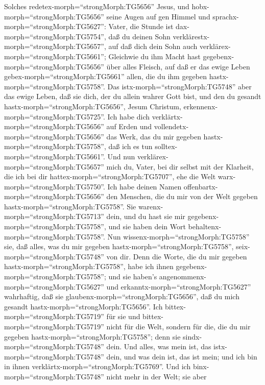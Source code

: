  Solches redetex-morph=``strongMorph:TG5656'' Jesus, und
hobx-morph=``strongMorph:TG5656'' seine Augen auf gen Himmel und
sprachx-morph=``strongMorph:TG5627'': Vater, die Stunde ist
dax-morph=``strongMorph:TG5754'', daß du deinen Sohn
verklärestx-morph=``strongMorph:TG5657'', auf daß dich dein Sohn auch
verklärex-morph=``strongMorph:TG5661'';  Gleichwie du ihm
Macht hast gegebenx-morph=``strongMorph:TG5656'' über alles Fleisch, auf
daß er das ewige Leben gebex-morph=``strongMorph:TG5661'' allen, die du
ihm gegeben hastx-morph=``strongMorph:TG5758''.  Das
istx-morph=``strongMorph:TG5748'' aber das ewige Leben, daß sie dich,
der du allein wahrer Gott bist, und den du gesandt
hastx-morph=``strongMorph:TG5656'', Jesum Christum,
erkennenx-morph=``strongMorph:TG5725''.  Ich habe dich
verklärtx-morph=``strongMorph:TG5656'' auf Erden und
vollendetx-morph=``strongMorph:TG5656'' das Werk, das du mir gegeben
hastx-morph=``strongMorph:TG5758'', daß ich es tun
solltex-morph=``strongMorph:TG5661''.  Und nun
verklärex-morph=``strongMorph:TG5657'' mich du, Vater, bei dir selbst
mit der Klarheit, die ich bei dir hattex-morph=``strongMorph:TG5707'',
ehe die Welt warx-morph=``strongMorph:TG5750''.  Ich habe
deinen Namen offenbartx-morph=``strongMorph:TG5656'' den Menschen, die
du mir von der Welt gegeben hastx-morph=``strongMorph:TG5758''. Sie
warenx-morph=``strongMorph:TG5713'' dein, und du hast sie mir
gegebenx-morph=``strongMorph:TG5758'', und sie haben dein Wort
behaltenx-morph=``strongMorph:TG5758''.  Nun
wissenx-morph=``strongMorph:TG5758'' sie, daß alles, was du mir gegeben
hastx-morph=``strongMorph:TG5758'', seix-morph=``strongMorph:TG5748''
von dir.  Denn die Worte, die du mir gegeben
hastx-morph=``strongMorph:TG5758'', habe ich ihnen
gegebenx-morph=``strongMorph:TG5758''; und sie haben's
angenommenx-morph=``strongMorph:TG5627'' und
erkanntx-morph=``strongMorph:TG5627'' wahrhaftig, daß sie
glaubenx-morph=``strongMorph:TG5656'', daß du mich gesandt
hastx-morph=``strongMorph:TG5656''.  Ich
bittex-morph=``strongMorph:TG5719'' für sie und
bittex-morph=``strongMorph:TG5719'' nicht für die Welt, sondern für die,
die du mir gegeben hastx-morph=``strongMorph:TG5758''; denn sie
sindx-morph=``strongMorph:TG5748'' dein.  Und alles, was
mein ist, das istx-morph=``strongMorph:TG5748'' dein, und was dein ist,
das ist mein; und ich bin in ihnen
verklärtx-morph=``strongMorph:TG5769''.  Und ich
binx-morph=``strongMorph:TG5748'' nicht mehr in der Welt; sie aber
